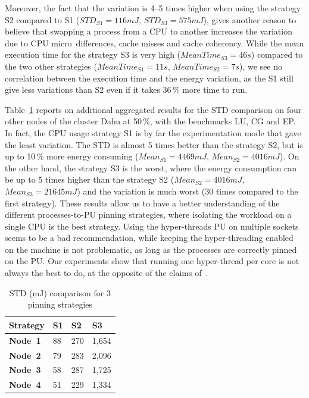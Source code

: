 Moreover, the fact that the variation is 4--5 times higher when using the strategy \textsf{S2} compared to \textsf{S1} ($STD_{S1}=116 mJ$, $STD_{S3}=575 mJ$), gives another reason to believe that swapping a process from a CPU to another increases the variation due to CPU micro~differences, cache misses and cache coherency.
While the mean execution time for the strategy \textsf{S3} is very high ($MeanTime_{S3}= 46 s$) compared to the two other strategies ($MeanTime_{S1}= 11 s$, $MeanTime_{S2}= 7 s$), we see no correlation between the execution time and the energy variation, as the \textsf{S1} still give less variations than \textsf{S2} even if it takes 36\,\% more time to run.

Table~\ref{table:corespinning} reports on additional aggregated results for the STD comparison on four other nodes of the cluster \textsf{Dahu} at 50\,\%, with the benchmarks \textsf{LU}, \textsf{CG} and \textsf{EP}.
In fact, the CPU usage strategy \textsf{S1} is by far the experimentation mode that gave the least variation.
The STD is almost 5 times better than the strategy \textsf{S2}, but is up to 10\,\% more energy consuming ($Mean_{S1}=4469 mJ$, $Mean_{S2}=4016 mJ$).
On the other hand, the strategy \textsf{S3} is the worst, where the energy consumption can be up to 5 times higher than the strategy \textsf{S2} ($Mean_{S2}=4016 mJ$, $Mean_{S3}=21645 mJ$) and the variation is much worst (30 times compared to the first strategy).
These results allow us to have a better understanding of the different processes-to-PU pinning strategies, where isolating the workload on a single CPU is the best strategy.
Using the hyper-threads PU on multiple sockets seems to be a bad recommendation, while keeping the hyper-threading enabled on the machine is not problematic, as long as the processes are correctly pinned on the PU.
Our experiments show that running one hyper-thread per core is not always the best to do, at the opposite of the claims of~\cite{marathe_empirical_2017_m}.

\begin{table}
    \centering
    \caption{STD (mJ) comparison for 3 pinning strategies}
    \label{table:corespinning}
    \small
    \begin{tabular}{|l|l|l|l|}
        \hline
        \textbf{Strategy} & \textbf{S1} & \textbf{S2} & \textbf{S3} \\
        \hline
        \hline
        \textbf{Node~1}   & 88          & 270         & 1,654       \\
        \hline
        \textbf{Node~2}   & 79          & 283         & 2,096       \\
        \hline
        \textbf{Node~3}   & 58          & 287         & 1,725       \\
        \hline
        \textbf{Node~4}   & 51          & 229         & 1,334       \\
        \hline
    \end{tabular}
\end{table}

